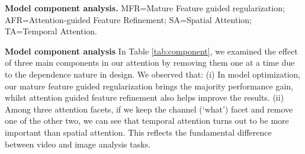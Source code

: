 \documentclass[runningheads]{llncs}
\newcommand{\keypoint}[1]{\vspace{0.1cm}\noindent\textbf{#1}\quad}
\begin{document}
\begin{table}[h]
    \begin{minipage}{.55\linewidth}
    \scriptsize
      \centering
	\vspace{.1cm}
	\caption{
	{\bf \scriptsize Model component analysis.}
	\scriptsize{
	MFR=Mature Feature guided regularization;
	AFR=Attention-guided Feature Refinement;
	SA=Spatial Attention; 
	TA=Temporal Attention.
	}
	}
	\label{tab:component}
    \end{minipage}\hfill
    \begin{minipage}{.4\linewidth}
      \centering
	\vspace{.1cm}
	\caption{
	{\bf \scriptsize Comparing attention models}. \scriptsize{
	NL=Non Local;
	\newline
	\newline
	}
	}
	\label{tab:att}
    \end{minipage} 
\end{table}

\keypoint{Model component analysis}
In Table \ref{tab:component}, we examined the effect of three main components in our \shortname{} attention
by removing them one at a time
due to the dependence nature in design.
We observed that:
(i) In model optimization,
our mature feature guided regularization brings the majority performance gain,
whilst attention guided feature refinement also helps improve the results.
(ii) Among three attention facets, if we keep the channel (`what') facet and remove one of the other two, we can see that 
temporal attention turns out to be more important than
spatial attention. This reflects the fundamental difference
between video and image analysis tasks.
\end{document}
